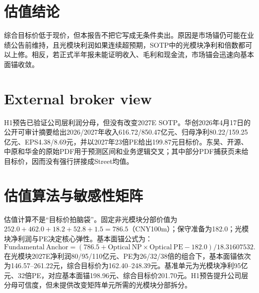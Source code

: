 \section{估值结论}
综合目标价低于现价，但本报告不把它写成无条件卖出。原因是市场锚仍可能在业绩公告前维持，且光模块利润如果连续超预期，SOTP中的光模块净利和倍数都可以上修。相反，若正式半年报未能证明收入、毛利和现金流，市场锚会迅速向基本面锚收敛。

\section{External broker view}
H1预告已验证公司层利润分母，但没有改变2027E SOTP。华创2026年4月17日的公开可审计摘要给出2026/2027年收入616.72/850.47亿元、归母净利80.22/159.25亿元、EPS4.38/8.69元，并以2027年23倍PE给出199.87元目标价。东吴、开源、中原和华金的原始PDF用于预测区间和业务逻辑交叉；其中部分PDF捕获页未给目标价，因而没有强行拼接成Street均值。


\section{估值算法与敏感性矩阵}
估值计算不是“目标价拍脑袋”。固定非光模块分部价值为$252.0+462.0+18.2+52.8+1.5=786.5$（CNY100m）；保守准备为182.0；光模块净利润与PE决定核心弹性。基本面锚公式为：
\[
\mathrm{Fundamental\ Anchor}=(786.5+\mathrm{Optical\ NP}\times\mathrm{Optical\ PE}-182.0)/18.31607532.
\]
在光模块2027E净利润80/95/110亿元、PE为26/32/38倍的组合下，基本面锚依次为146.57--261.22元，综合目标价为162.40--248.39元。基准单元为光模块净利95亿元、32倍PE，对应基本面锚198.96元、综合目标价201.70元。H1预告提升公司层分母可信度，但未提供改变矩阵单元所需的光模块分部拆分。
